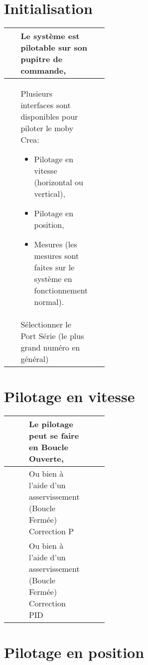 

\section{Initialisation}

\begin{tabular}{|Ep{0.4\linewidth}|p{.5\linewidth}|}
\hline
& Le système est pilotable sur son pupitre de commande,
&\tabularnewline\hline
 & Plusieurs interfaces sont disponibles pour piloter le moby Crea:
 \begin{itemize}
  \item Pilotage en vitesse (horizontal ou vertical),
  \item Pilotage en position,
  \item Mesures (les mesures sont faites sur le système en fonctionnement normal).
 \end{itemize}
&\tabularnewline\hline
& Sélectionner le Port Série (le plus grand numéro en général)
&\tabularnewline\hline
\end{tabular}


\section{Pilotage en vitesse}
 
\begin{tabular}{|Ep{0.4\linewidth}|p{.5\linewidth}|}
\hline
& Le pilotage peut se faire en Boucle Ouverte,
&\tabularnewline\hline
& Ou bien à l'aide d'un asservissement (Boucle Fermée) Correction P
&\tabularnewline\hline
& Ou bien à l'aide d'un asservissement (Boucle Fermée) Correction PID
&\tabularnewline\hline
\end{tabular}

\section{Pilotage en position}
 
